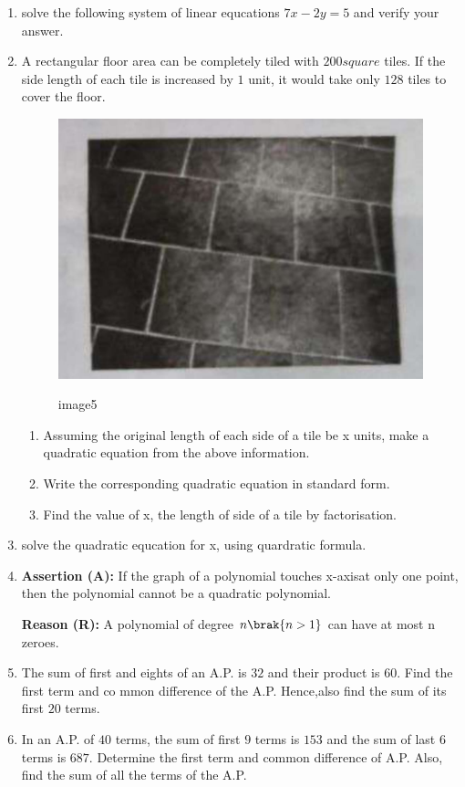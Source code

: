 \begin{enumerate}
\item solve the following system of linear equcations $7x-2y=5$ and verify your answer.
\item A rectangular floor area can be completely tiled with $200square$ tiles. If the side length of each tile is increased by $1$ unit, it would take only $128$ tiles to cover the floor.
\begin{figure}[!ht]
\centering
\includegraphics[width=\columnwidth]{figs/a1.jpg}
\label{fig:image5}
\caption{image5}
\end{figure}
\begin{enumerate}
\item Assuming the original length of each side of a tile be x units, make a quadratic equation from the above information.\
\item Write the corresponding quadratic equation in standard form.\
\item Find the value of x, the length of side of a tile by factorisation.
\end{enumerate}
\item solve the quadratic equcation for x, using quardratic formula.
\item \textbf{Assertion (A):} If the graph of a polynomial touches x-axisat only one point, then the polynomial cannot be a quadratic polynomial.

\textbf{Reason (R):} A polynomial of degree $n\brak{n > 1}$ can have at most n zeroes.
\item  The sum of first and eights of an A.P. is $32$ and their product is $60$. Find the first term  and co
mmon difference of the A.P. Hence,also find the sum of its first $20$ terms.
\item In an A.P. of $40$ terms, the sum of first $9$ terms is $153$ and the sum of last $6$ terms is $687$.
Determine the first term and common difference of A.P. Also, find the sum of all the terms of the A.P.





\end{enumerate}
